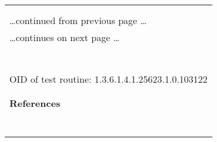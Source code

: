 \documentclass{article}
\begin{document}
\begin{longtable}{|p{}|}
\hline
\rowcolor{openvas_warning}{\color{white}{Medium (CVSS: 4.3) }}\\
\rowcolor{openvas_warning}{\color{white}{NVT: Apache Web Server ETag Header Information Disclosure Weakness}}\\
\hline
\endfirsthead
\hfill\ldots continued from previous page \ldots \\
\hline
\endhead
\hline
\ldots continues on next page \ldots \\
\endfoot
\hline
\endlastfoot
\\
\rowcolor{white}{\verb=Information that was gathered:=}\\
\rowcolor{white}{\verb=Inode: 152086=}\\
\rowcolor{white}{\verb=Size: 177=}\\
\rowcolor{white}{\verb==}\\
\rowcolor{white}{\verb==}\\
\\
OID of test routine: 1.3.6.1.4.1.25623.1.0.103122\\
\\

      \hline
      \\
\textbf{References}\\
\rowcolor{white}{\verb=CVE: CVE-2003-1418=}\\
\rowcolor{white}{\verb=BID:6939=}\\
\rowcolor{white}{\verb=Other:=}\\
\rowcolor{white}{\verb=  URL:https://www.securityfocus.com/bid/6939=}\\
\rowcolor{white}{\verb=   URL:http://httpd.apache.org/docs/mod/core.html#fileetag=}\\
\rowcolor{white}{\verb=   URL:http://www.openbsd.org/errata32.html=}\\
\rowcolor{white}{\verb=   URL:http://support.novell.com/docs/Tids/Solutions/10090670.html=}\\
\end{longtable}
\end{document}
